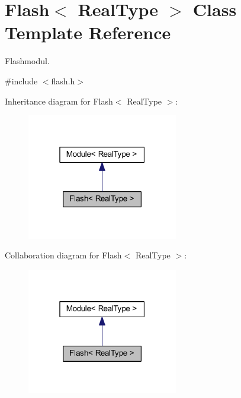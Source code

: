 \hypertarget{class_flash}{}\section{Flash$<$ Real\+Type $>$ Class Template Reference}
\label{class_flash}


Flashmodul.  




{\ttfamily \#include $<$flash.\+h$>$}



Inheritance diagram for Flash$<$ Real\+Type $>$\+:\nopagebreak
\begin{figure}[H]
\begin{center}
\leavevmode
\includegraphics[width=187pt]{class_flash__inherit__graph}
\end{center}
\end{figure}


Collaboration diagram for Flash$<$ Real\+Type $>$\+:\nopagebreak
\begin{figure}[H]
\begin{center}
\leavevmode
\includegraphics[width=187pt]{class_flash__coll__graph}
\end{center}
\end{figure}
